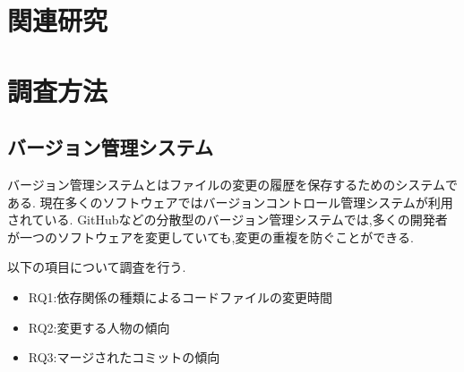 \documentclass[submit,ses,noauthor]{ipsj} %
\begin{document}
\section{関連研究}


                                                                                                                                                                                                                                                                                                                                                                                                                                                                                                                                                                                                                                                                                                                                                                                                                                                                                                                                                                                                                                                                                                                                                                                                                                                                                                                                                                                 
\section{調査方法}\label{調査方法}


\subsection{バージョン管理システム}
バージョン管理システムとはファイルの変更の履歴を保存するためのシステムである.
現在多くのソフトウェアではバージョンコントロール管理システムが利用されている.
GitHubなどの分散型のバージョン管理システムでは,多くの開発者が一つのソフトウェアを変更していても,変更の重複を防ぐことができる.




以下の項目について調査を行う.
\begin{itemize}
\item RQ1:依存関係の種類によるコードファイルの変更時間
\item RQ2:変更する人物の傾向
\item RQ3:マージされたコミットの傾向
\end{itemize}
\end{document}
